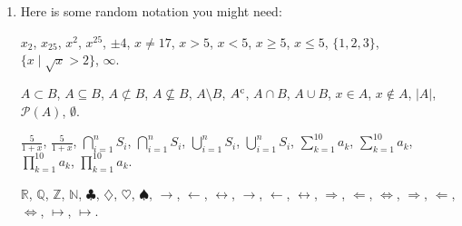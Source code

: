 \documentclass{article} %
\begin{document}
\begin{enumerate}
\item
Here is some random notation you might need: 
\vspace{.5\baselineskip}
 
$x_2$,
$x_{25}$, %
$x^2$,
$x^{25}$, %
$\pm 4$,
$x \not = 17$, %
$x > 5$, 
$x < 5$, 
$x \geq 5$, 
$x \leq 5$,
$\{ 1, 2, 3 \}$, %
$\{ x \mid \sqrt{x} > 2 \}$,
$\infty$.
\vspace{.5\baselineskip}

$A \subset B$, 
$A \subseteq B$,
$A \not \subset B$,
$A \not \subseteq B$,
$A \setminus B$,
$A^{\rm c}$, %
$A \cap B$,
$A \cup B$,
$x \in A$, 
$x \not \in A$, 
$|A|$, 
$\mathcal{P}(A)$, 
$\emptyset$.
\vspace{.5\baselineskip}

$\frac{5}{1+x}$, 
$\displaystyle\frac{5}{1+x}$, %
$\bigcap_{i=1}^n S_i$,
$\displaystyle\bigcap_{i=1}^n S_i$,
$\bigcup_{i=1}^n S_i$,
$\displaystyle\bigcup_{i=1}^n S_i$,
$\sum_{k=1}^{10} a_k$,
$\displaystyle\sum_{k=1}^{10} a_k$,
$\prod_{k=1}^{10} a_k$,
$\displaystyle\prod_{k=1}^{10} a_k$.
\vspace{.5\baselineskip}

$\mathbb{R}$, %
$\mathbb{Q}$, %
$\mathbb{Z}$, %
$\mathbb{N}$, %
$\clubsuit$, 
$\diamondsuit$,
$\heartsuit$,
$\spadesuit$,
$\rightarrow$, 
$\leftarrow$,
$\leftrightarrow$, 
$\longrightarrow$,
$\longleftarrow$,
$\longleftrightarrow$,
$\Rightarrow$, %
$\Leftarrow$,
$\Leftrightarrow$, %
$\Longrightarrow$, %
$\Longleftarrow$,
$\Longleftrightarrow$, %
$\mapsto$,
$\longmapsto$.
\vspace{.5\baselineskip}


\end{enumerate}
\end{document}
